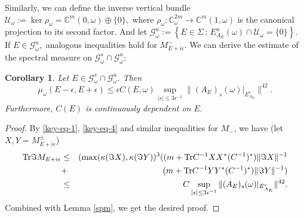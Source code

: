 \documentclass[11pt]{amsart}
\newtheorem{coro}[theorem]{Corollary}
\theoremstyle{remark}
\theoremstyle{definition}
\newcommand{\tr}{{\rm Tr}}
\begin{document}
Similarly, we can define the inverse vertical bundle 
    $
    \mathcal{U}_\omega := \ker \rho_\omega = \mathbb{C}^m(0,\omega) \oplus \{0\},
    $
    where \( \rho_\omega: \mathbb{C}^{2m}_\omega \to \mathbb{C}^m(1,\omega) \) is the canonical projection to its second factor. And let $\mathcal{G}^u_\omega :=  \left\{ E \in \Sigma \,:\, E^u_{A_E}(\omega) \cap \mathcal{U}_\omega = \{0\} \right\}.$ If $E\in \mathcal{G}^u_\omega,$    analogous inequalities hold for $M^-_{E+i\epsilon}$.
  We can derive the estimate of the spectral measure on $\mathcal{G}_\omega^s\cap \mathcal{G}_\omega^u$:
\begin{coro}\label{JL} Let   $E\in\mathcal{G}_\omega^s\cap \mathcal{G}_\omega^u$. Then
    $$\mu_\omega(E-\epsilon, E+\epsilon)\leq  \epsilon C(E,\omega) \sup_{|s|\leq 3 \epsilon^{-1}}\|(A_E)_{s}(\omega)|_{E^c_{A_E}}\|^{42}.$$
    Furthermore, $C(E)$ is continuously dependent on $E.$
\end{coro}
\begin{proof}
    By \eqref{key-eq-1}, \eqref{key-eq-4} and similar inequalities for $M_-$, we have (let $X,Y=M^{\pm}_{E+i\epsilon}$)
\begin{eqnarray*}
 \tr\Im M_{E+i\epsilon}
&\leq& (\max(\kappa(\Im X),\kappa(\Im Y))^3 ((m  +  \tr C^{-1} XX^\ast(C^{-1})^*) \|\Im  X\|^{-1} \\&+&(m  + \tr C^{-1} YY^\ast(C^{-1})^*) \|\Im  Y\|^{-1})\nonumber\\
&\leq & C\sup_{|s|\leq 3 \epsilon^{-1}}\|(A_E)_{s}(\omega)|_{E^c_{A_E}}\|^{42} .
\end{eqnarray*}
Combined with  Lemma \ref{spm}, we get the desired proof.
\end{proof}
\end{document}
